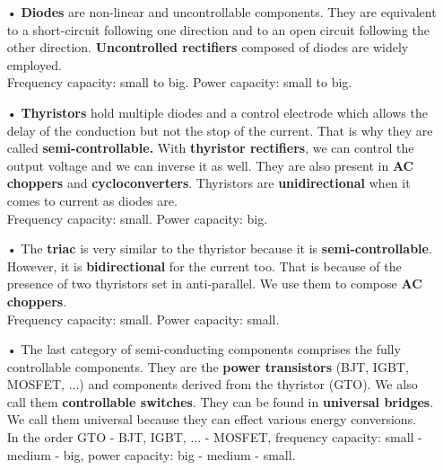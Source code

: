 		\begin{itemize}
			\item[•] \textbf{Diodes} are non-linear and uncontrollable components. They are equivalent to a short-circuit following one direction and to an open circuit following the other direction. \textbf{Uncontrolled rectifiers} composed of diodes are widely employed. \\
			Frequency capacity: small to big.
			Power capacity: small to big.\\
			
			\item[•] \textbf{Thyristors} hold multiple diodes and a control electrode which allows the delay of the conduction but not the stop of the current. That is why they are called \textbf{semi-controllable.}  With \textbf{thyristor rectifiers}, we can control the output voltage and we can inverse it as well. They are also present in \textbf{AC choppers} and \textbf{cycloconverters}. Thyristors are \textbf{unidirectional} when it comes to current as diodes are.\\
			Frequency capacity: small.
			Power capacity: big.\\
			
			\item[•] The  \textbf{triac} is very similar to the thyristor because it is \textbf{semi-controllable}. However, it is \textbf{bidirectional} for the current too. That is because of the presence of two thyristors set in anti-parallel. We use them to compose \textbf{AC choppers}.\\
			Frequency capacity: small.
			Power capacity: small.\\
			
			\item[•] The last category of semi-conducting components comprises the fully controllable components. They are the \textbf{power transistors} (BJT, IGBT, MOSFET, ...) and components derived from the thyristor (GTO). We also call them \textbf{controllable switches}. They can be found in \textbf{universal bridges}. We call them universal because they can effect various energy conversions. \\
			In the order GTO - BJT, IGBT, ... - MOSFET, frequency capacity: small - medium - big, power capacity: big - medium - small. 
		\end{itemize}
		
